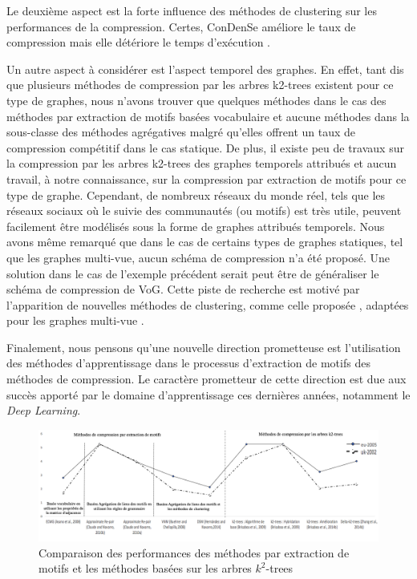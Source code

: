 Le deuxième aspect est la forte influence des méthodes de clustering sur les performances de la compression. Certes, \gls{ConDenSe} \citep{liu2018reducing} améliore le taux de compression mais elle détériore le temps d'exécution .

Un autre aspect à considérer est l'aspect temporel des graphes. En effet, tant dis que plusieurs méthodes de compression par les arbres k2-trees existent pour ce type de graphes, nous n'avons trouver que quelques méthodes dans le cas des méthodes par extraction de motifs basées vocabulaire et aucune méthodes dans la sous-classe des méthodes agrégatives malgré qu'elles offrent un taux de compression compétitif dans le cas statique. De plus, il existe peu de travaux sur la compression par les arbres k2-trees des graphes temporels attribués et aucun travail, à notre connaissance, sur la compression par extraction de motifs pour ce type de graphe. Cependant, de nombreux réseaux du monde réel, tels que les réseaux sociaux où le suivie des communautés (ou motifs) est très utile, peuvent facilement être modélisés sous la forme de graphes attribués temporels. Nous avons même remarqué que dans le cas de certains types de graphes statiques, tel que les graphes multi-vue, aucun schéma de compression n'a été proposé. Une solution dans le cas de l'exemple précédent serait peut être de généraliser le schéma de compression de VoG. Cette piste de recherche est motivé par l'apparition de nouvelles méthodes de clustering, comme celle proposée \citep{wang2019study}, adaptées pour les graphes multi-vue .


Finalement, nous pensons qu'une nouvelle direction prometteuse est l'utilisation des méthodes d'apprentissage dans le processus d'extraction de motifs des méthodes de compression. Le caractère prometteur de cette direction est due aux succès apporté par le domaine d'apprentissage ces dernières années, notamment le \textit{Deep Learning}. %
			
				\begin{landscape}					
\begin{figure}[H]	
				\centering						
				\includegraphics[scale=0.55]{ressources/image/globale.png} 
					\centering
					\caption{Comparaison des performances des méthodes par extraction de motifs et les méthodes basées sur les arbres $k^2$-trees }
					\label{comparaisonVo}
				\end{figure}	
\end{landscape}